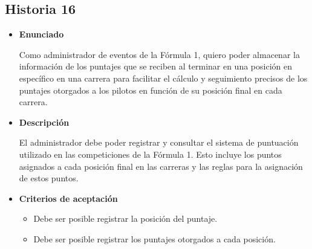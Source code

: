 \documentclass{article}
\begin{document}
	\subsection{Historia 16}
	\begin{itemize}
		
		\item \large{\textbf{Enunciado}}
		\begin{description}
			Como administrador de eventos de la Fórmula 1, quiero poder almacenar la información de los puntajes que se reciben al terminar en una posición en específico en una carrera para facilitar el cálculo y seguimiento precisos de los puntajes otorgados a los pilotos en función de su posición final en cada carrera.

		\end{description}
		
		\item \large{\textbf{Descripción}}
		\begin{description}
			El administrador debe poder registrar y consultar el sistema de puntuación utilizado en las competiciones de la Fórmula 1. Esto incluye los puntos asignados a cada posición final en las carreras y las reglas para la asignación de estos puntos.

		\end{description}
		
		\item \large{\textbf{Criterios de aceptación}}
		\begin{itemize}
			\item Debe ser posible registrar la posición del puntaje.
			\item Debe ser posible registrar los puntajes otorgados a cada posición.
			
		\end{itemize}
		
	\end{itemize}
	
\end{document}
